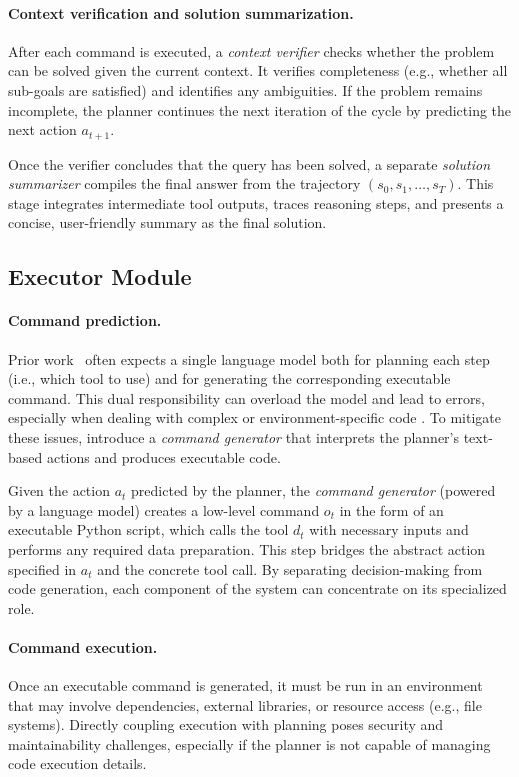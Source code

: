 \paragraph{Context verification and solution summarization.}
After each command is executed, a \emph{context verifier} checks whether the problem can be solved given the current context. It verifies completeness (e.g., whether all sub-goals are satisfied) and identifies any ambiguities. If the problem remains incomplete, the planner continues the next iteration of the cycle by predicting the next action $a_{t+1}$.

Once the verifier concludes that the query has been solved, a separate \emph{solution summarizer} compiles the final answer from the trajectory $(s_0,s_1,\dots, s_T)$. This stage integrates intermediate tool outputs, traces reasoning steps, and presents a concise, user-friendly summary as the final solution.

\subsection{Executor Module}
\label{sec:agent_execution}

\paragraph{Command prediction.} Prior work~\cite{lu2023chameleon, hu2024visual} often expects a single language model both for planning each step (i.e., which tool to use) and for generating the corresponding executable command. This dual responsibility can overload the model and lead to errors, especially when dealing with complex or environment-specific code \cite{bran2023chemcrow,li2024formal,ji2024testing}. To mitigate these issues, \model introduce a \emph{command generator} that interprets the planner’s text-based actions and produces executable code.

Given the action $a_t$ predicted by the planner, the \emph{command generator} (powered by a language model) creates a low-level command $o_t$ in the form of an executable Python script, which calls the tool $d_t$ with necessary inputs and performs any required data preparation. This step bridges the abstract action specified in $a_t$ and the concrete tool call. By separating decision-making from code generation, each component of the system can concentrate on its specialized role.

\paragraph{Command execution.}
Once an executable command is generated, it must be run in an environment that may involve dependencies, external libraries, or resource access (e.g., file systems). Directly coupling execution with planning poses security and maintainability challenges, especially if the planner is not capable of managing code execution details.

